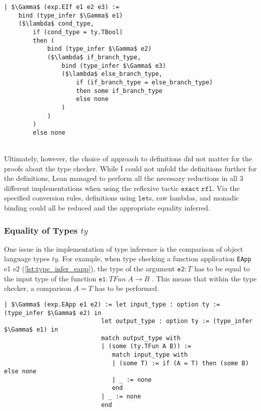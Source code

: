 \documentclass{article}
\newcommand{\tt}[1]{\texttt{#1}}
\begin{document}
\begin{minipage}{\textwidth}
\begin{lstlisting}[mathescape = true, caption={Updated type inference definition for {\tt{EIf}}.}, captionpos=b, label={lst:monadic_eif}]
| $\Gamma$ (exp.EIf e1 e2 e3) :=
    bind (type_infer $\Gamma$ e1)
    ($\lambda$ cond_type,
        if (cond_type = ty.TBool)
        then (
            bind (type_infer $\Gamma$ e2)
            ($\lambda$ if_branch_type,
                bind (type_infer $\Gamma$ e3)
                ($\lambda$ else_branch_type,
                    if (if_branch_type = else_branch_type)
                    then some if_branch_type
                    else none
                )
            )
        )
        else none
\end{lstlisting}
\end{minipage} \\

Ultimately, however, the choice of approach to definitions did not matter for the proofs about the type checker. While I could not unfold the definitions further for the definitions, Lean managed to perform all the necessary reductions in all 3 different implementations when using the reflexive tactic ${\tt{exact}} \; {\tt{rfl}}$. Via the specified conversion rules, definitions using ${\tt{let}}$s, raw lambdas, and monadic binding could all be reduced and the appropriate equality inferred. \\

\subsubsection{Equality of Types $ty$}
One issue in the implementation of type inference is the comparison of object language types $ty$. For example, when type checking a function application {\tt{EApp} e1 e2} (\ref{lst:type_infer_eapp}), the type of the argument ${\tt{e2}} : T$ has to be equal to the input type of the function ${\tt{e1}} : TFun \; A \to B$ . This means that within the type checker, a comparison $A = T$ has to be performed.

\begin{minipage}{\textwidth}
\begin{lstlisting}[mathescape = true, caption={Type inference of {\tt{EApp}}.}, captionpos=b, label={lst:type_infer_eapp}]
| $\Gamma$ (exp.EApp e1 e2) := let input_type : option ty := (type_infer $\Gamma$ e2) in
                           let output_type : option ty := (type_infer $\Gamma$ e1) in
                           match output_type with
                           | (some (ty.TFun A B)) :=
                              match input_type with
                              | (some T) := if (A = T) then (some B) else none
                              | _ := none
                              end
                           | _ := none
                           end
\end{lstlisting}
\end{minipage} \\
\end{document}

